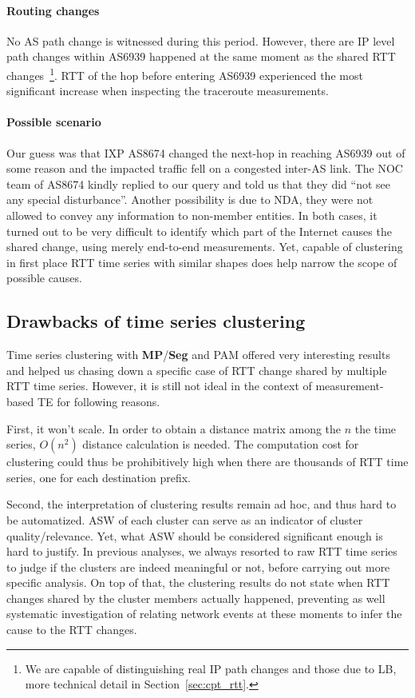 \paragraph*{Routing changes} No AS path change is witnessed during this period.
However, there are IP level path changes within AS6939 happened at the same moment as the shared RTT changes~\footnote{We are capable of distinguishing real IP path changes and those due to \ac{LB}, more technical detail in Section~\ref{sec:cpt_rtt}.}.
RTT of the hop before entering AS6939 experienced the most significant increase when inspecting the traceroute measurements.

\paragraph*{Possible scenario} Our guess was that IXP AS8674 changed the next-hop in reaching AS6939 out of some reason and the impacted traffic fell on a congested inter-AS link.
The \acf{NOC} team of AS8674 kindly replied to our query and told us that they did ``not see any special disturbance''. 
Another possibility is due to \acf{NDA}, they were not allowed to convey any information to non-member entities.
In both cases, it turned out to be very difficult to identify which part of the Internet causes the shared change, using merely end-to-end measurements.
Yet, capable of clustering in first place RTT time series with similar shapes does help narrow the scope of possible causes.

\subsection{Drawbacks of time series clustering}

Time series clustering with \textbf{MP}/\textbf{Seg} and \ac{PAM} offered very interesting results and helped us chasing down a specific case of RTT change shared by multiple RTT time series.
However, it is still not ideal in the context of measurement-based TE for following reasons.

First, it won't scale. In order to obtain a distance matrix among the $n$ the time series, $O(n^2)$ distance calculation is needed. The computation cost for clustering could thus be prohibitively high when there are thousands of RTT time series, one for each destination prefix. 

Second, the interpretation of clustering results remain ad hoc, and thus hard to be automatized. \ac{ASW} of each cluster can serve as an indicator of cluster quality/relevance. Yet, what \ac{ASW} should be considered significant enough is hard to justify. In previous analyses, we always resorted to raw RTT time series to judge if the clusters are indeed meaningful or not, before carrying out more specific analysis. On top of that, the clustering results do not state when RTT changes shared by the cluster members actually happened, preventing as well systematic investigation of relating network events at these moments to infer the cause to the RTT changes.

